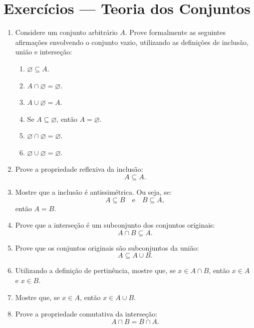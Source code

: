 \documentclass[12pt]{article}
\begin{document}
\vspace*{0.2cm}
\section*{Exercícios — Teoria dos Conjuntos}



\begin{enumerate}

\item Considere um conjunto arbitrário \(A\). Prove formalmente as seguintes afirmações envolvendo o conjunto vazio, utilizando as definições de inclusão, união e interseção:

\begin{enumerate}[label=\alph*)]
    \item \(\varnothing \subseteq A\).
    \item \(A \cap \varnothing = \varnothing\).
    \item \(A \cup \varnothing = A\).
    \item Se \(A \subseteq \varnothing\), então \(A = \varnothing\).
    \item \(\varnothing \cap \varnothing = \varnothing\).
    \item \(\varnothing \cup \varnothing = \varnothing\).
\end{enumerate}

\item Prove a propriedade reflexiva da inclusão:
\[
A \subseteq A.
\]

\item Mostre que a inclusão é antissimétrica. Ou seja, se:
\[
A \subseteq B \quad \text{e} \quad B \subseteq A,
\]
então \(A = B\).

\item Prove que a interseção é um subconjunto dos conjuntos originais:
\[
A \cap B \subseteq A.
\]

\item Prove que os conjuntos originais são subconjuntos da união:
\[
A \subseteq A \cup B.
\]

\item Utilizando a definição de pertinência, mostre que, se \(x \in A \cap B\), então \(x \in A\) e \(x \in B\).

\item Mostre que, se \(x \in A\), então \(x \in A \cup B\).

\item Prove a propriedade comutativa da interseção:
\[
A \cap B = B \cap A.
\]

\end{enumerate}
\end{document}
